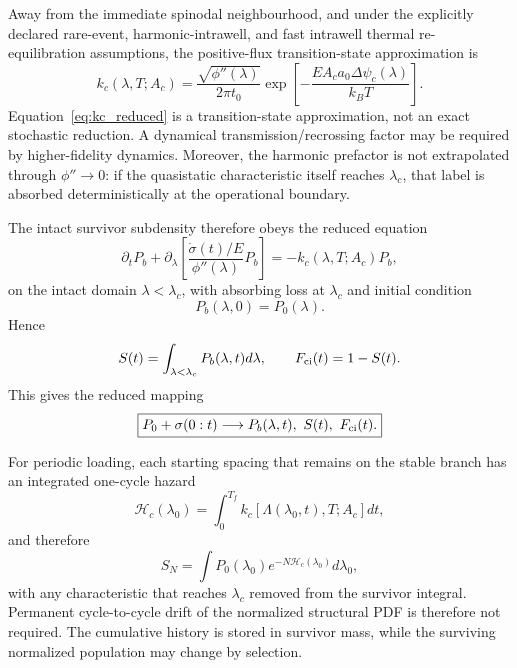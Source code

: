 Away from the immediate spinodal neighbourhood, and under the explicitly declared rare-event, harmonic-intrawell, and fast intrawell thermal re-equilibration assumptions, the positive-flux transition-state approximation is
\begin{equation}
k_c(\lambda,T;A_c)
=\frac{\sqrt{\phi''(\lambda)}}{2\pi t_0}
\exp\left[-\frac{EA_ca_0\Delta\psi_c(\lambda)}{k_BT}\right].
\label{eq:kc_reduced}
\end{equation}
Equation~\eqref{eq:kc_reduced} is a transition-state approximation, not an exact stochastic reduction. A dynamical transmission/recrossing factor may be required by higher-fidelity dynamics. Moreover, the harmonic prefactor is not extrapolated through $\phi''\to0$: if the quasistatic characteristic itself reaches $\lambda_c$, that label is absorbed deterministically at the operational boundary.

The intact survivor subdensity therefore obeys the reduced equation
\begin{equation}
\boxed{
\partial_tP_b
+\partial_\lambda\left[
\frac{\dot\sigma(t)/E}{\phi''(\lambda)}P_b
\right]
=-k_c(\lambda,T;A_c)P_b,
}
\label{eq:final_survivor_pde}
\end{equation}
on the intact domain $\lambda<\lambda_c$, with absorbing loss at $\lambda_c$ and initial condition
\begin{equation}
P_b(\lambda,0)=P_0(\lambda).
\end{equation}
Hence
\begin{equation}
S(t)=\int_{\lambda<\lambda_c} P_b(\lambda,t)d\lambda,
\qquad
F_{\rm ci}(t)=1-S(t).
\end{equation}
This gives the reduced mapping
\begin{equation}
\boxed{
P_0+\sigma(0:t)\longrightarrow P_b(\lambda,t),\ S(t),\ F_{\rm ci}(t).
}
\end{equation}

For periodic loading, each starting spacing that remains on the stable branch has an integrated one-cycle hazard
\begin{equation}
\mathcal H_c(\lambda_0)=\int_0^{T_f}k_c[\Lambda(\lambda_0,t),T;A_c]dt,
\end{equation}
and therefore
\begin{equation}
\boxed{
S_N=\int P_0(\lambda_0)e^{-N\mathcal H_c(\lambda_0)}d\lambda_0,
}
\label{eq:cycle_survival}
\end{equation}
with any characteristic that reaches $\lambda_c$ removed from the survivor integral. Permanent cycle-to-cycle drift of the normalized structural PDF is therefore not required. The cumulative history is stored in survivor mass, while the surviving normalized population may change by selection.

